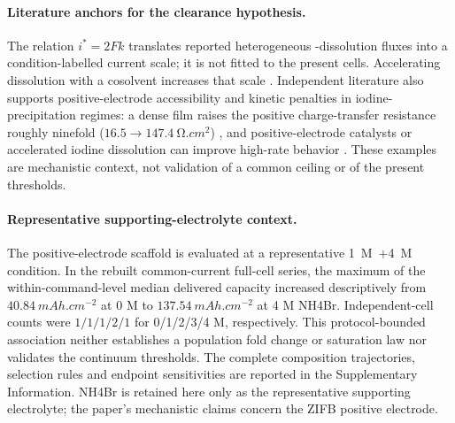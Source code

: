 \documentclass[11pt]{article}
\begin{document}
\paragraph{Literature anchors for the clearance hypothesis.}\label{sec:rate}
The relation $i^{*}=2Fk$ translates reported heterogeneous -dissolution fluxes into a
condition-labelled current scale; it is not fitted to the present cells. Accelerating dissolution with a
cosolvent increases that scale \citep{Zhao2022}. Independent literature also supports positive-electrode
accessibility and kinetic penalties in iodine-precipitation regimes: a
dense  film raises the positive charge-transfer resistance roughly ninefold
($16.5\!\to\!147.4~\si{\ohm.cm^2}$) \citep{Jang2021}, and positive-electrode catalysts or accelerated iodine
dissolution can improve high-rate behavior \citep{ShakeriHosseinabad2023,Yang2023}. These examples are
mechanistic context, not validation of a common ceiling or of the present thresholds.

\paragraph{Representative supporting-electrolyte context.}\label{sec:res-chem}
The positive-electrode scaffold is evaluated at a representative
\SI{1}{M}~$+$\SI{4}{M}~ condition. In the rebuilt common-current full-cell series, the
maximum of the within-command-level median delivered capacity increased descriptively from
$40.84~\si{mAh.cm^{-2}}$ at 0 M to $137.54~\si{mAh.cm^{-2}}$ at 4 M NH4Br. Independent-cell counts were
$1/1/1/2/1$ for 0/1/2/3/4 M, respectively. This protocol-bounded association neither establishes a population
fold change or saturation law nor validates the continuum thresholds. The complete composition trajectories,
selection rules and endpoint sensitivities are reported in the Supplementary Information. NH4Br is retained
here only as the representative supporting electrolyte; the paper's mechanistic claims concern the ZIFB
positive electrode.
\end{document}
